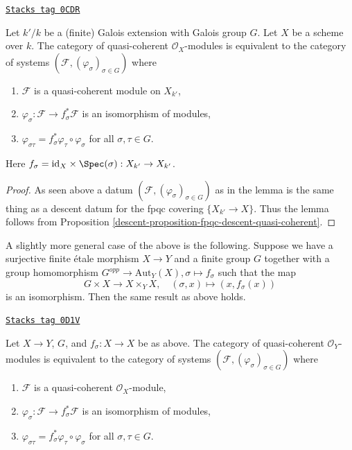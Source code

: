 \begin{lemma}
\label{descent-lemma-galois-descent}
\href{https://stacks.math.columbia.edu/tag/0CDR}{\texttt{Stacks tag 0CDR}}

Let $k'/k$ be a (finite) Galois extension with Galois group $G$.
Let $X$ be a scheme over $k$. The category of quasi-coherent
$\mathcal{O}_X$-modules is equivalent to the category of systems
$(\mathcal{F}, (\varphi_\sigma)_{\sigma \in G})$ where
\begin{enumerate}
\item $\mathcal{F}$ is a quasi-coherent module on $X_{k'}$,
\item $\varphi_\sigma : \mathcal{F} \to f_\sigma^*\mathcal{F}$
is an isomorphism of modules,
\item $\varphi_{\sigma\tau} = f_\sigma^*\varphi_\tau \circ \varphi_\sigma$
for all $\sigma, \tau \in G$.
\end{enumerate}
Here $f_\sigma = \text{id}_X \times \Spec(\sigma) : X_{k'} \to X_{k'}$.
\end{lemma}

\begin{proof}

As seen above a datum $(\mathcal{F}, (\varphi_\sigma)_{\sigma \in G})$
as in the lemma is the same thing as a descent datum for the
fpqc covering $\{X_{k'} \to X\}$. Thus the lemma follows from
Proposition \ref{descent-proposition-fpqc-descent-quasi-coherent}.
\end{proof}

A slightly more general case of the above is the following.
Suppose we have a surjective finite \'etale morphism $X \to Y$
and a finite group $G$ together with a group homomorphism
$G^{opp} \to \text{Aut}_Y(X), \sigma \mapsto f_\sigma$
such that the map
$$
G \times X \longrightarrow X \times_Y X,\quad
(\sigma, x) \longmapsto (x, f_\sigma(x))
$$
is an isomorphism. Then the same result as above holds.

\begin{lemma}
\label{descent-lemma-galois-descent-more-general}
\href{https://stacks.math.columbia.edu/tag/0D1V}{\texttt{Stacks tag 0D1V}}

Let $X \to Y$, $G$, and $f_\sigma : X \to X$ be as above.
The category of quasi-coherent
$\mathcal{O}_Y$-modules is equivalent to the category of systems
$(\mathcal{F}, (\varphi_\sigma)_{\sigma \in G})$ where
\begin{enumerate}
\item $\mathcal{F}$ is a quasi-coherent $\mathcal{O}_X$-module,
\item $\varphi_\sigma : \mathcal{F} \to f_\sigma^*\mathcal{F}$
is an isomorphism of modules,
\item $\varphi_{\sigma\tau} = f_\sigma^*\varphi_\tau \circ \varphi_\sigma$
for all $\sigma, \tau \in G$.
\end{enumerate}
\end{lemma}

